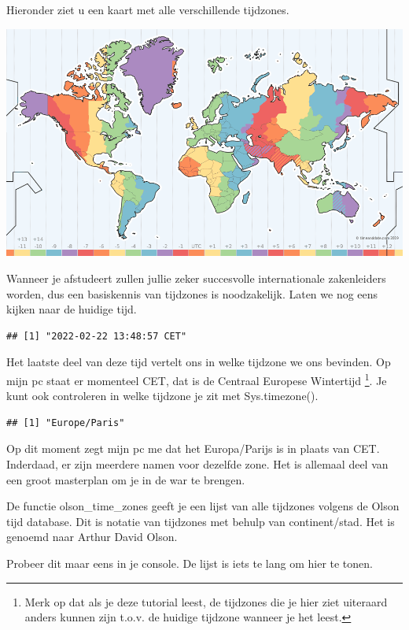 \documentclass[]{tufte-book}
\begin{document}
Hieronder ziet u een kaart met alle verschillende tijdzones.

\begin{center}\includegraphics[width=1\linewidth]{images/timezones} \end{center}

Wanneer je afstudeert zullen jullie zeker succesvolle internationale zakenleiders worden, dus een basiskennis van tijdzones is noodzakelijk. Laten we nog eens kijken naar de huidige tijd.

\begin{verbatim}
## [1] "2022-02-22 13:48:57 CET"
\end{verbatim}

Het laatste deel van deze tijd vertelt ons in welke tijdzone we ons bevinden. Op mijn pc staat er momenteel CET, dat is de Centraal Europese Wintertijd \footnote{Merk op dat als je deze tutorial leest, de tijdzones die je hier ziet uiteraard anders kunnen zijn t.o.v. de huidige tijdzone wanneer je het leest.}. Je kunt ook controleren in welke tijdzone je zit met Sys.timezone().

\begin{verbatim}
## [1] "Europe/Paris"
\end{verbatim}

Op dit moment zegt mijn pc me dat het Europa/Parijs is in plaats van CET. Inderdaad, er zijn meerdere namen voor dezelfde zone. Het is allemaal deel van een groot masterplan om je in de war te brengen.

De functie olson\_time\_zones geeft je een lijst van alle tijdzones volgens de Olson tijd database. Dit is notatie van tijdzones met behulp van continent/stad. Het is genoemd naar Arthur David Olson.

Probeer dit maar eens in je console. De lijst is iets te lang om hier te tonen.
\end{document}
